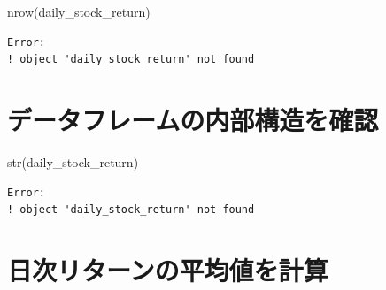 \documentclass[
  letterpaper,
  DIV=11,
  numbers=noendperiod]{scrreprt}
\newenvironment{Shaded}{\begin{snugshade}}{\end{snugshade}}
\newcommand{\DocumentationTok}[1]{\textcolor[rgb]{0.37,0.37,0.37}{\textit{#1}}}
\newcommand{\FunctionTok}[1]{\textcolor[rgb]{0.28,0.35,0.67}{#1}}
\newcommand{\NormalTok}[1]{\textcolor[rgb]{0.00,0.23,0.31}{#1}}
\newcommand{\SpecialCharTok}[1]{\textcolor[rgb]{0.37,0.37,0.37}{#1}}
\begin{document}
\begin{Shaded}
\begin{Highlighting}[]
\FunctionTok{nrow}\NormalTok{(daily\_stock\_return)}
\end{Highlighting}
\end{Shaded}

\begin{verbatim}
Error:
! object 'daily_stock_return' not found
\end{verbatim}

\section{データフレームの内部構造を確認}\label{ux30c7ux30fcux30bfux30d5ux30ecux30fcux30e0ux306eux5185ux90e8ux69cbux9020ux3092ux78baux8a8d}

\begin{Shaded}
\begin{Highlighting}[]
\FunctionTok{str}\NormalTok{(daily\_stock\_return)}
\end{Highlighting}
\end{Shaded}

\begin{verbatim}
Error:
! object 'daily_stock_return' not found
\end{verbatim}

\begin{Shaded}
\end{Shaded}

\section{日次リターンの平均値を計算}\label{ux65e5ux6b21ux30eaux30bfux30fcux30f3ux306eux5e73ux5747ux5024ux3092ux8a08ux7b97}

\begin{Shaded}
\end{Shaded}
\end{document}

